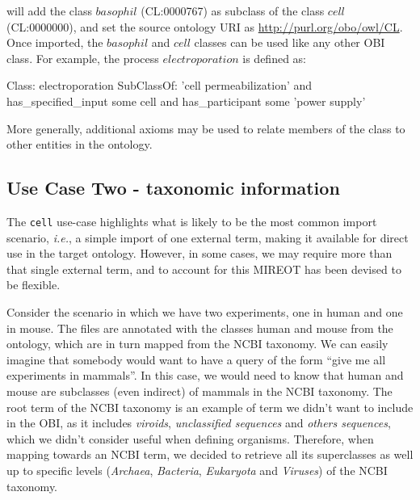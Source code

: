 \documentclass[jou]{ao2e}%
\begin{document}
will add the class $basophil$ (CL:0000767) as subclass of the class $cell$  (CL:0000000), and set the source ontology URI as \url{http://purl.org/obo/owl/CL}.
Once imported, the $basophil$ and $cell$ classes can be used like any other OBI class. For example, the process $electroporation$ is defined as:

\begin{footnotesize}
\begin{verbatimtab}
Class: electroporation
      SubClassOf: 'cell permeabilization'
                              and has_specified_input some cell
                              and has_participant some 'power supply'
\end{verbatimtab}
\end{footnotesize}

More generally, additional axioms may be used to relate members of the class to other entities in the ontology.


\subsection*{Use Case Two - taxonomic information}

The \texttt{cell} use-case highlights what is likely to be the most common import scenario, \emph{i.e.}, a simple import of one external term, making it available for direct use in the target ontology.
However, in some cases, we may require more than that single external term, and to account for this \ac{MIREOT} has been devised to be flexible.

Consider the scenario in which we have two experiments, one in human and one in mouse. 
The files are annotated with the classes human and mouse from the ontology, which are in turn mapped from the NCBI taxonomy. 
We can easily imagine that somebody would want to have a query of the form ``give me all 
experiments in mammals''. In this case, we would need to know that human and mouse are 
subclasses (even indirect) of mammals in the NCBI taxonomy. The root term of the NCBI taxonomy is an example of term we didn't want to include in the \ac{OBI}, as it includes \textit{viroids}, \textit{unclassified sequences} and \textit{others sequences}, which we didn't consider useful when defining organisms.  Therefore, when mapping 
towards an NCBI term, we decided to retrieve all its superclasses as well up to specific levels (\textit{Archaea}, \textit{Bacteria}, \textit{Eukaryota} and \textit{Viruses}) of the 
NCBI taxonomy. 
\end{document}
